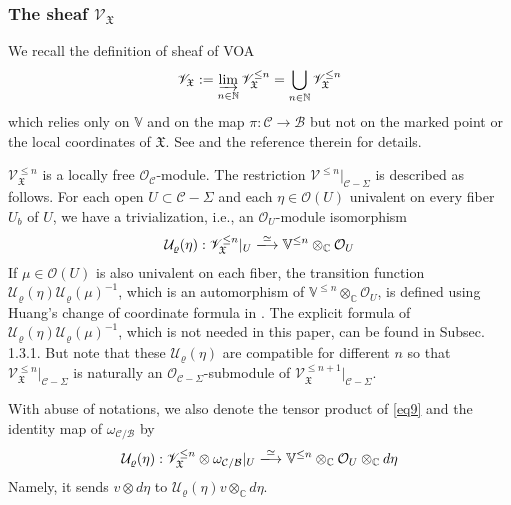 \documentclass[11pt,b5paper,notitlepage]{article}
\theoremstyle{definition}
\theoremstyle{plain}
\newcommand{\mc}{\mathcal}
\newcommand{\scr}{\mathscr}
\newcommand{\Vbb}{\mathbb V}
\newcommand{\Cbb}{\mathbb C}
\newcommand{\Nbb}{\mathbb N}
\newcommand{\<}{\left\langle}
\renewcommand{\>}{\right\rangle}
\newcommand{\MO}{\mathcal{O}}
\newcommand{\MC}{\mathcal{C}}
\newcommand{\MB}{\mathcal{B}}
\newcommand{\fx}{\mathfrak{X}}
\numberwithin{equation}{section}
\begin{document}
\subsubsection{The sheaf $\scr V_\fx$}


We recall the definition of sheaf of VOA
\begin{align*}
\scr V_\fx:=\varinjlim_{n\in\Nbb}\scr V_\fx^{\leq n}=\bigcup_{n\in\Nbb}\scr V_\fx^{\leq n}
\end{align*}
which relies only on $\Vbb$ and on the map $\pi:\MC\rightarrow\MB$ but not on the marked point or the local coordinates of $\fx$. See \cite[Subsec. 1.3.1]{GZ2} and the reference therein for details.


$\scr V^{\leq n}_\fx$ is a locally free $\MO_\MC$-module. The restriction $\scr V^{\leq n}|_{\MC-\Sigma}$ is described as follows. For each open $U\subset\MC-\Sigma$ and each $\eta\in \MO(U)$ univalent on every fiber $U_b$ of $U$, we have a trivialization, i.e., an $\MO_U$-module isomorphism
\begin{align}\label{eq9}
\mc U_\varrho(\eta):\scr V_\fx^{\leq n}|_U\xlongrightarrow{\simeq}\Vbb^{\leq n}\otimes_\Cbb\MO_U
\end{align}
If $\mu\in\MO(U)$ is also univalent on each fiber, the transition function $\mc U_\varrho(\eta)\mc U_\varrho(\mu)^{-1}$, which is an automorphism of $\Vbb^{\leq n}\otimes_\Cbb\MO_U$, is defined using Huang's change of coordinate formula in \cite{Hua97}. The explicit formula of $\mc U_\varrho(\eta)\mc U_\varrho(\mu)^{-1}$, which is not needed in this paper, can be found in Subsec. 1.3.1. But note that these $\mc U_\varrho(\eta)$ are compatible for different $n$ so that $\scr V_\fx^{\leq n}|_{\MC-\Sigma}$ is naturally an $\MO_{\MC-\Sigma}$-submodule of $\scr V_\fx^{\leq n+1}|_{\MC-\Sigma}$.

With abuse of notations, we also denote the tensor product of \eqref{eq9} and the identity map of $\omega_{\MC/\MB}$ by
\begin{align}\label{eq10}
\mc U_\varrho(\eta):\scr V^{\leq n}_\fx\otimes \omega_{\mc C/\mc B}|_U\xlongrightarrow{\simeq}\Vbb^{\leq n}\otimes_\Cbb\mc O_U\otimes_\Cbb d\eta
\end{align}
Namely, it sends $v\otimes d\eta$ to $\mc U_\varrho(\eta)v\otimes_\Cbb d\eta$.
\end{document}
